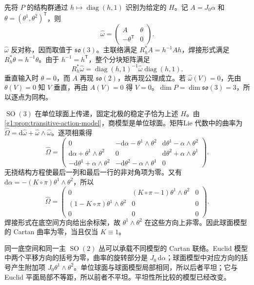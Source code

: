 \begin{solution}
	先将 \(P\) 的结构群通过 \(h\mapsto\operatorname{diag}(h,1)\) 识别为给定的 \(H\)。记 \(A=J_0\alpha\) 和 \(\theta=(\theta^1,\theta^2)^{\mathsf T}\)，则
	\[
		\widehat\omega=
		\begin{pmatrix}A&\theta\\-\theta^{\mathsf T}&0\end{pmatrix}.
	\]
	\(\widehat\omega\) 反对称，因而取值于 \(\mathfrak{so}(3)\)。主联络满足 \(R_h^*A=h^{-1}Ah\)，焊接形式满足 \(R_h^*\theta=h^{-1}\theta\)。由于 \(h^{-1}=h^{\mathsf T}\)，整个分块矩阵满足
	\[
		R_h^*\widehat\omega
		=\operatorname{diag}(h,1)^{-1}\widehat\omega
		\operatorname{diag}(h,1).
	\]
	垂直输入时 \(\theta=0\)，而 \(A\) 再现 \(\mathfrak{so}(2)\)，故再现公理成立。若 \(\widehat\omega(V)=0\)，先由 \(\theta(V)=0\) 知 \(V\) 垂直，再由 \(A(V)=0\) 得 \(V=0\)。\(\dim P=\dim\mathfrak{so}(3)=3\)，所以逐点为同构。

	\(\operatorname{SO}(3)\) 在单位球面上传递，固定北极的稳定子恰为上述 \(H\)。由\cref{g1:prop:transitive-action-model}，商模型是单位球面。矩阵Lie 代数中的曲率为
	\(\widehat\Omega=\mathrm{d}\widehat\omega+\widehat\omega\wedge\widehat\omega\)。逐项相乘得
	\[
		\widehat\Omega=
		\begin{pmatrix}
			0&-\mathrm{d}\alpha-\theta^1\wedge\theta^2&
			\mathrm{d}\theta^1-\alpha\wedge\theta^2\\
			\mathrm{d}\alpha+\theta^1\wedge\theta^2&0&
			\mathrm{d}\theta^2+\alpha\wedge\theta^1\\
			-\mathrm{d}\theta^1+\alpha\wedge\theta^2&
			-\mathrm{d}\theta^2-\alpha\wedge\theta^1&0
		\end{pmatrix}.
	\]
	无挠结构方程使最后一列和最后一行的非对角项为零。又有 \(\mathrm{d}\alpha=-(K\circ\pi)\theta^1\wedge\theta^2\)，所以
	\[
		\widehat\Omega=
		\begin{pmatrix}
			0&(K\circ\pi-1)\theta^1\wedge\theta^2&0\\
			(1-K\circ\pi)\theta^1\wedge\theta^2&0&0\\
			0&0&0
		\end{pmatrix}.
	\]
	焊接形式在底空间方向给出余标架，故 \(\theta^1\wedge\theta^2\) 在这些方向上非零。因此球面模型的 Cartan 曲率为零，当且仅当 \(K\equiv1\)。

	同一底空间和同一主 \(\operatorname{SO}(2)\) 丛可以承载不同模型的 Cartan 联络。Euclid 模型中两个平移方向的括号为零，曲率的旋转部分是 \(J_0\,\mathrm{d}\alpha\)；球面模型中对应方向的括号产生附加项 \(J_0\theta^1\wedge\theta^2\)。单位球面与球面模型局部相同，所以后者平坦；它与Euclid 平面局部不等距，所以前者不平坦。平坦性所比较的模型已经改变。
\end{solution}

